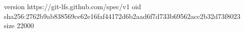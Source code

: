 version https://git-lfs.github.com/spec/v1
oid sha256:2762b9ab838569ce62e16faf44172d6b2aad6f7d733b69562acc2b32d73f8023
size 22000
